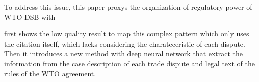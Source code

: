 To address this issue, 
this paper proxys the organization of regulatory power of WTO DSB with 



first shows the low quality result to map this complex pattern which only uses the citation itself, which lacks considering the charateceristic of each dispute.
Then it introduces a new method with deep neural network that extract the information from the case description of each trade dispute and legal text of the rules of the WTO agreement.

